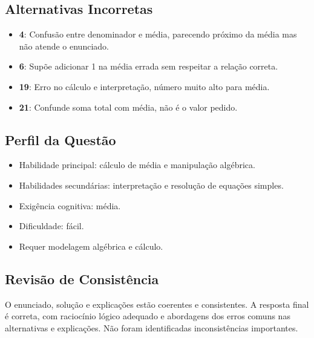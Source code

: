 \documentclass{article}
\begin{document}
\subsection*{Alternativas Incorretas}

\begin{itemize}
  \item \textbf{4}: Confusão entre denominador e média, parecendo próximo da média mas não atende o enunciado.
  \item \textbf{6}: Supõe adicionar 1 na média errada sem respeitar a relação correta.
  \item \textbf{19}: Erro no cálculo e interpretação, número muito alto para média.
  \item \textbf{21}: Confunde soma total com média, não é o valor pedido.
\end{itemize}

\subsection*{Perfil da Questão}

\begin{itemize}
  \item Habilidade principal: cálculo de média e manipulação algébrica.
  \item Habilidades secundárias: interpretação e resolução de equações simples.
  \item Exigência cognitiva: média.
  \item Dificuldade: fácil.
  \item Requer modelagem algébrica e cálculo.
\end{itemize}

\subsection*{Revisão de Consistência}
O enunciado, solução e explicações estão coerentes e consistentes. A resposta final é correta, com raciocínio lógico adequado e abordagens dos erros comuns nas alternativas e explicações. Não foram identificadas inconsistências importantes.
\end{document}
